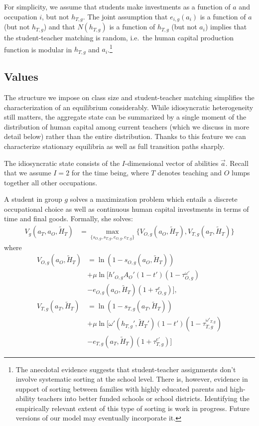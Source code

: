\documentclass[onehalfspacing,11pt]{article}
\begin{document}
For simplicity, we assume that students make investments as a function of $a$ and occupation $i$, but not $h_{T,g}$. The joint assumption that $e_{i,g}(a_i)$ is a function of $a$ (but not $h_{T,g}$) and that $N(h_{T,g})$ is a function of $h_{T,g}$ (but not $a_i$) implies that the student-teacher matching is random, i.e.~the human capital production function is modular in $h_{T,g}$ and $a_i$.\footnote{The anecdotal evidence suggests that student-teacher assignments don't involve systematic sorting at the school level. There is, however, evidence in support of sorting between families with highly educated parents and high-ability teachers into better funded schools or school districts. Identifying the empirically relevant extent of this type of sorting is work in progress. Future versions of our model may eventually incorporate it.}

\subsection{Values}
The structure we impose on class size and student-teacher matching simplifies the characterization of an equilibrium considerably. While idiosyncratic heterogeneity still matters, the aggregate state can be summarized by a single moment of the distribution of human capital among current teachers (which we discuss in more detail below) rather than the entire distribution. Thanks to this feature we can characterize stationary equilibria as well as full transition paths sharply.

The idiosyncratic state consists of the $I$-dimensional vector of abilities $\vec{a}$. Recall that we assume $I=2$ for the time being, where $T$ denotes teaching and $O$ lumps together all other occupations.

A student in group $g$ solves a maximization problem which entails a discrete occupational choice as well as continuous human capital investments in terms of time and final goods. Formally, she solves:
\begin{align}
\label{}
V_g(a_T,a_O,\widetilde{H}_T) & = \max_{\{s_{O,g},s_{T,g},e_{O,g},e_{T,g}\}} \bigg\{ V_{O,g}(a_O,\widetilde{H}_T), V_{T,g}(a_T,\widetilde{H}_T) \bigg\} \label{eq:V}
\end{align}
where
\begin{align}
V_{O,g}(a_O,\widetilde{H}_T) & = \ln\left(1-s_{O,g}\left(a_O,\widetilde{H}_T\right)\right) \nonumber \\
& + \mu \ln \Big[ {{h'}_{O,g}} A_O'(1-t')(1-\tau^{\omega '}_{O,g}) \nonumber \\
& - e_{O,g}(a_O,\widetilde{H}_T)(1+\tau^e_{O,g}) \Big], \label{eq:VO} \\
V_{T,g}(a_T,\widetilde{H}_T) & = \ln\left(1-s_{T,g}\left(a_T,\widetilde{H}_T\right)\right) \nonumber \\
& + \mu \ln \Big[ \omega'({h_{T,g}'},{\widetilde{H}_{T}'})(1-t')(1-\tau^{\omega'_{T,g}}_{T,g}) \nonumber \\
& - e_{T,g}(a_T,\widetilde{H}_T)(1+\tau^{e '}_{T,g}) \Big] \label{eq:VT}
\end{align}
\end{document}
